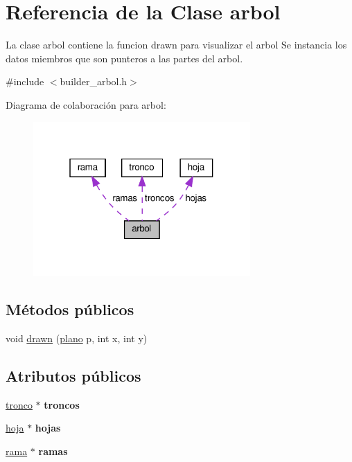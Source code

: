 \hypertarget{classarbol}{}\section{Referencia de la Clase arbol}
\label{classarbol}


La clase arbol contiene la funcion drawn para visualizar el arbol  Se instancia los datos miembros que son punteros a las partes del arbol.  




{\ttfamily \#include $<$builder\+\_\+arbol.\+h$>$}



Diagrama de colaboración para arbol\+:
\nopagebreak
\begin{figure}[H]
\begin{center}
\leavevmode
\includegraphics[width=235pt]{classarbol__coll__graph}
\end{center}
\end{figure}
\subsection*{Métodos públicos}
\begin{DoxyCompactItemize}
\item 
void \hyperlink{classarbol_a2b280a669a809d02bb86754349d7c339}{drawn} (\hyperlink{classplano}{plano} p, int x, int y)
\end{DoxyCompactItemize}
\subsection*{Atributos públicos}
\begin{DoxyCompactItemize}
\item 
\mbox{\label{classarbol_a7e70557693f5d2ce7acc8071b2e3456f}} 
\hyperlink{classtronco}{tronco} $\ast$ {\bfseries troncos}
\item 
\mbox{\label{classarbol_a6ace1361b0755b05450406a1495b947f}} 
\hyperlink{classhoja}{hoja} $\ast$ {\bfseries hojas}
\item 
\mbox{\label{classarbol_ad98638d8955eb676de30474789fdbdd4}} 
\hyperlink{classrama}{rama} $\ast$ {\bfseries ramas}
\end{DoxyCompactItemize}



